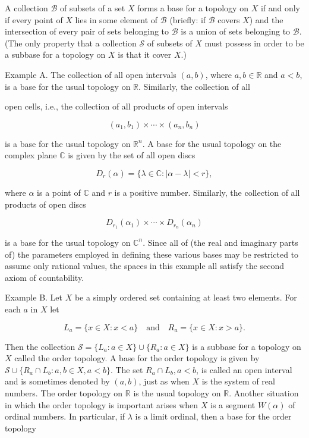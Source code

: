 A collection $\mathcal{B}$ of subsets of a set $X$ forms a base for a topology on $X$ if and only if every point of $X$ lies in some element of $\mathcal{B}$ (briefly: if $\mathcal{B}$ covers $X$) and the intersection of every pair of sets belonging to $\mathcal{B}$ is a union of sets belonging to $\mathcal{B}$. (The only property that a collection $\mathcal{S}$ of subsets of $X$ must possess in order to be a subbase for a topology on $X$ is that it cover $X$.)

Example A. The collection of all open intervals $(a, b)$, where $a, b \in \mathbb{R}$ and $a < b$, is a base for the usual topology on $\mathbb{R}$. Similarly, the collection of all

open cells, i.e., the collection of all products of open intervals

$$(a_1, b_1) \times \cdots \times (a_n, b_n)$$

is a base for the usual topology on $\mathbb{R}^n$. A base for the usual topology on the complex plane $\mathbb{C}$ is given by the set of all open discs

$$D_r(\alpha) = \{\lambda \in \mathbb{C} : |\alpha - \lambda| < r\},$$

where $\alpha$ is a point of $\mathbb{C}$ and $r$ is a positive number. Similarly, the collection of all products of open discs

$$D_{r_1}(\alpha_1) \times \cdots \times D_{r_n}(\alpha_n)$$

is a base for the usual topology on $\mathbb{C}^n$. Since all of (the real and imaginary parts of) the parameters employed in defining these various bases may be restricted to assume only rational values, the spaces in this example all satisfy the second axiom of countability.

Example B. Let $X$ be a simply ordered set containing at least two elements. For each $a$ in $X$ let

$$L_a = \{x \in X : x < a\} \quad \text{and} \quad R_a = \{x \in X : x > a\}.$$

Then the collection $\mathcal{S} = \{L_a : a \in X\} \cup \{R_a : a \in X\}$ is a subbase for a topology on $X$ called the order topology. A base for the order topology is given by $\mathcal{S} \cup \{R_a \cap L_b : a, b \in X, a < b\}$. The set $R_a \cap L_b, a < b$, is called an open interval and is sometimes denoted by $(a, b)$, just as when $X$ is the system of real numbers. The order topology on $\mathbb{R}$ is the usual topology on $\mathbb{R}$. Another situation in which the order topology is important arises when $X$ is a segment $W(\alpha)$ of ordinal numbers. In particular, if $\lambda$ is a limit ordinal, then a base for the order topology

